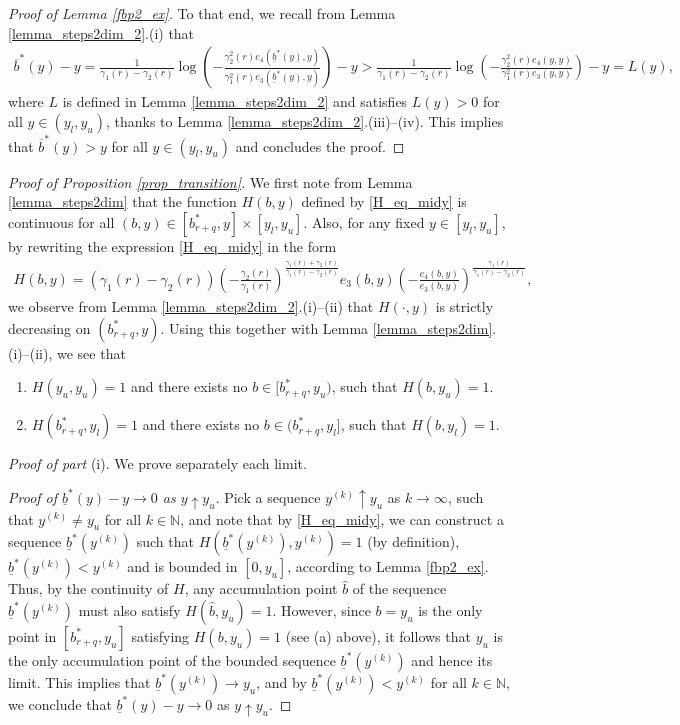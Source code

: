 \documentclass[11pt]{article} %
\def\N{\mathbb{N}}
\newcommand{\ubar}[1]{\underaccent{\bar}{#1}}
\numberwithin{komcounter}{section}
\renewcommand{\hat}{\widehat}
\renewcommand{\ubar}{\underline}
\renewcommand{\bar}{\overline}
\numberwithin{equation}{section}
\numberwithin{theorem}{section}
\begin{document}
\begin{proof}[Proof of Lemma \ref{fbp2_ex}]
To that end, we recall from Lemma \ref{lemma_steps2dim_2}.(i) that 
\begin{align*}
\bar{b}^*(y)-y=\frac{1}{\gamma_1(r)-\gamma_2(r)}\log\left(-\frac{\gamma_2^2(r)e_4(\ubar{b}^*(y),y)}{\gamma_1^2(r)e_3(\ubar{b}^*(y),y)}\right) - y 
> \frac{1}{\gamma_1(r)-\gamma_2(r)} \log\left(-\frac{\gamma_2^2(r)e_4(y,y)}{\gamma_1^2(r)e_3(y,y)}\right) - y = L(y),
\end{align*}
where $L$ is defined in Lemma \ref{lemma_steps2dim_2} and satisfies $L(y)>0$ for all $y\in (y_l,y_u)$, thanks to Lemma \ref{lemma_steps2dim_2}.(iii)--(iv). 
This implies that $\bar{b}^*(y)>y$ for all $y\in (y_l,y_u)$ and concludes the proof.
\end{proof}



\begin{proof}[Proof of Proposition \ref{prop_transition}] 
We first note from Lemma \ref{lemma_steps2dim} that the function $H(b,y)$ defined by \eqref{H_eq_midy} is continuous for all $(b,y) \in [b^*_{r+q},y] \times [y_l,y_u]$. 
Also, for any fixed $y \in [y_l, y_u]$, by rewriting the expression \eqref{H_eq_midy} in the form
\begin{align*} 
H(b,y)= (\gamma_1(r)-\gamma_2(r)) \left(-\frac{\gamma_2(r)}{\gamma_1(r)}\right)^{\frac{\gamma_1(r)+\gamma_2(r)}{\gamma_1(r)-\gamma_2(r)}}  e_3(b,y) \left(-\frac{e_4(b,y)}{ e_3(b,y)}\right)^{\frac{\gamma_1(r)}{\gamma_1(r)-\gamma_2(r)}},
\end{align*}
we observe from Lemma \ref{lemma_steps2dim_2}.(i)--(ii) that $H(\cdot,y)$ is strictly decreasing on $(b^*_{r+q},y)$. 
Using this together with Lemma \ref{lemma_steps2dim}.(i)--(ii), we see that
\begin{enumerate}
\item [(a)] $H(y_u, y_u) = 1$ and there exists no $b \in [b^*_{r+q}, y_u)$, such that $H(b, y_u) = 1$.  
\item [(b)] $H(b_{r+q}^*, y_l) = 1$ and there exists no $b \in (b_{r+q}^*, y_l]$, such that $H(b, y_l) = 1$.  
\end{enumerate}

{\it Proof of part} (i). 
We prove separately each limit.

{\it Proof of $\ubar{b}^*(y)-y \to 0$ as $y\uparrow y_u$}.
Pick a sequence $y^{(k)} \uparrow y_u$ as $k \to \infty$, such that $y^{(k)} \neq y_u$ for all $k \in \N$, and note that by \eqref{H_eq_midy}, we can construct a sequence $\ubar{b}^*(y^{(k)})$ such that $H(\ubar{b}^*(y^{(k)}), y^{(k)}) = 1$ (by definition), $\ubar{b}^*(y^{(k)})< y^{(k)}$ and is bounded in $[0, y_u]$, according to Lemma \ref{fbp2_ex}. 
Thus, by the continuity of $H$, any accumulation point $\hat b$ of the sequence $\ubar{b}^*(y^{(k)})$ must also satisfy $H(\hat b, y_u) = 1$. 
However, since $b=y_u$ is the only point in $[b^*_{r+q}, y_u]$ satisfying $H(b, y_u) = 1$ (see (a) above), it follows that $y_u$ is the only accumulation point of the bounded sequence $\ubar{b}^*(y^{(k)})$ and hence its limit. 
This implies that $\ubar{b}^*(y^{(k)}) \to y_u$, and by $\ubar{b}^*(y^{(k)}) < y^{(k)}$ for all $k \in \N$, we conclude that $\ubar{b}^*(y)-y \to 0$ as $y\uparrow y_u$. 


\end{proof}
\end{document}
